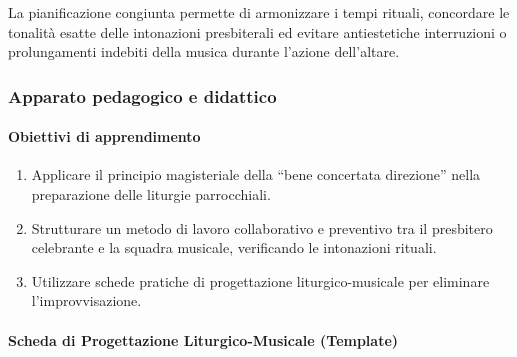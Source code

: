 \documentclass[12pt,a4paper]{article}
\begin{document}
	La pianificazione congiunta permette di armonizzare i tempi rituali, concordare le tonalità esatte delle intonazioni presbiterali ed evitare antiestetiche interruzioni o prolungamenti indebiti della musica durante l'azione dell'altare.
	
	\subsubsection{Apparato pedagogico e didattico}\label{apparato-pedagogico-e-didattico-13}
	
	\paragraph{Obiettivi di apprendimento}\label{obiettivi-di-apprendimento-13}
	
	\begin{enumerate}[label=\arabic*.,leftmargin=*]
		\item Applicare il principio magisteriale della ``bene concertata direzione'' nella preparazione delle liturgie parrocchiali.
		\item Strutturare un metodo di lavoro collaborativo e preventivo tra il presbitero celebrante e la squadra musicale, verificando le intonazioni rituali.
		\item Utilizzare schede pratiche di progettazione liturgico-musicale per eliminare l'improvvisazione.
	\end{enumerate}
	
	\paragraph{Scheda di Progettazione Liturgico-Musicale (Template)}\label{scheda-di-progettazione-liturgico-musicale-template}
	
\end{document}
